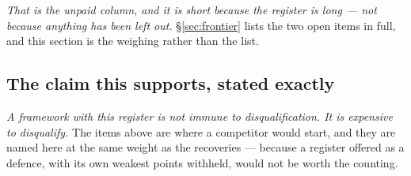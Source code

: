 \documentclass[11pt,a4paper]{article}
\theoremstyle{plain}
\theoremstyle{definition}
\begin{document}
\emph{That is the unpaid column, and it is short because the register is long --- not because anything
has been left out.} \S\ref{sec:frontier} lists the two open items in full, and this section is the
weighing rather than the list.

\subsection{The claim this supports, stated exactly}

\emph{A framework with this register is not immune to disqualification. It is expensive to disqualify.} The
items above are where a competitor would start, and they are named here at the same weight as the
recoveries --- because a register offered as a defence, with its own weakest points withheld, would not be
worth the counting.
\end{document}
